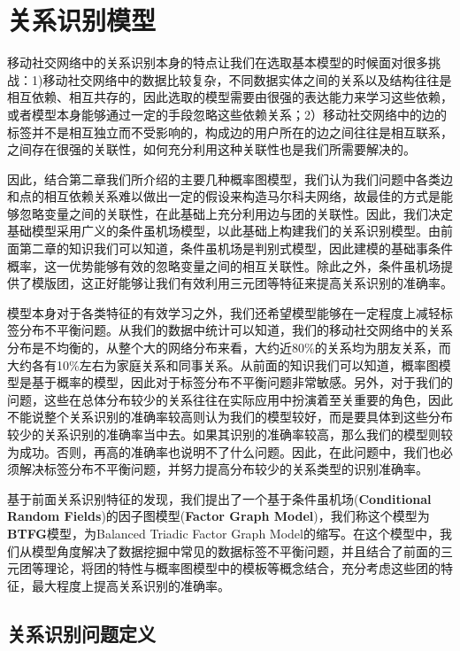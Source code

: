 \chapter{关系识别模型}
\qquad 移动社交网络中的关系识别本身的特点让我们在选取基本模型的时候面对很多挑战：1)移动社交网络中的数据比较复杂，不同数据实体之间的关系以及结构往往是相互依赖、相互共存的，因此选取的模型需要由很强的表达能力来学习这些依赖，或者模型本身能够通过一定的手段忽略这些依赖关系；2）移动社交网络中的边的标签并不是相互独立而不受影响的，构成边的用户所在的边之间往往是相互联系，之间存在很强的关联性，如何充分利用这种关联性也是我们所需要解决的。

因此，结合第二章我们所介绍的主要几种概率图模型，我们认为我们问题中各类边和点的相互依赖关系难以做出一定的假设来构造马尔科夫网络，故最佳的方式是能够忽略变量之间的关联性，在此基础上充分利用边与团的关联性。因此，我们决定基础模型采用广义的条件虽机场模型，以此基础上构建我们的关系识别模型。由前面第二章的知识我们可以知道，条件虽机场是判别式模型，因此建模的基础事条件概率，这一优势能够有效的忽略变量之间的相互关联性。除此之外，条件虽机场提供了模版团，这正好能够让我们有效利用三元团等特征来提高关系识别的准确率。


模型本身对于各类特征的有效学习之外，我们还希望模型能够在一定程度上减轻标签分布不平衡问题。从我们的数据中统计可以知道，我们的移动社交网络中的关系分布是不均衡的，从整个大的网络分布来看，大约近80\%的关系均为朋友关系，而大约各有10\%左右为家庭关系和同事关系。从前面的知识我们可以知道，概率图模型是基于概率的模型，因此对于标签分布不平衡问题非常敏感。另外，对于我们的问题，这些在总体分布较少的关系往往在实际应用中扮演着至关重要的角色，因此不能说整个关系识别的准确率较高则认为我们的模型较好，而是要具体到这些分布较少的关系识别的准确率当中去。如果其识别的准确率较高，那么我们的模型则较为成功。否则，再高的准确率也说明不了什么问题。因此，在此问题中，我们也必须解决标签分布不平衡问题，并努力提高分布较少的关系类型的识别准确率。



基于前面关系识别特征的发现，我们提出了一个基于条件虽机场(\textbf{Conditional Random Fields})的因子图模型(\textbf{Factor Graph Model})，我们称这个模型为\textbf{BTFG}模型，为Balanced Triadic Factor Graph Model的缩写。在这个模型中，我们从模型角度解决了数据挖掘中常见的数据标签不平衡问题，并且结合了前面的三元团等理论，将团的特性与概率图模型中的模板等概念结合，充分考虑这些团的特征，最大程度上提高关系识别的准确率。


\section{关系识别问题定义}

